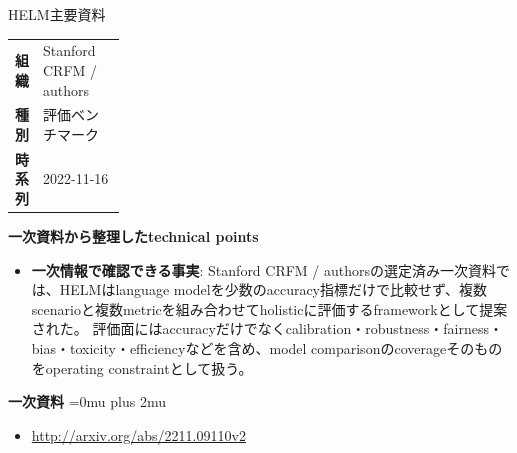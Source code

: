 \begin{technicalnote}{HELM}{主要資料}
\begingroup
\begin{tabularx}{\linewidth}{@{}>{\bfseries}p{0.22\linewidth}X@{}}
組織 & Stanford CRFM / authors \\
種別 & 評価ベンチマーク \\
時系列 & 2022-11-16 \\
\end{tabularx}
\smallskip
{\bfseries 一次資料から整理したtechnical points}
\begin{itemize}[leftmargin=1.5em,itemsep=0.35em]
\item \textbf{一次情報で確認できる事実}: Stanford CRFM / authorsの選定済み一次資料では、HELMはlanguage modelを少数のaccuracy指標だけで比較せず、複数scenarioと複数metricを組み合わせてholisticに評価するframeworkとして提案された。 評価面にはaccuracyだけでなくcalibration・robustness・fairness・bias・toxicity・efficiencyなどを含め、model comparisonのcoverageそのものをoperating constraintとして扱う。
\end{itemize}
\begin{minipage}{\linewidth}
\begin{samepage}
{\bfseries 一次資料}
\begingroup\sloppy
\Urlmuskip=0mu plus 2mu\relax
\begin{itemize}[leftmargin=1.5em,itemsep=0.25em]
\item {\scriptsize\url{http://arxiv.org/abs/2211.09110v2}}
\end{itemize}
\endgroup
\end{samepage}
\end{minipage}
\endgroup
\end{technicalnote}
\medskip

